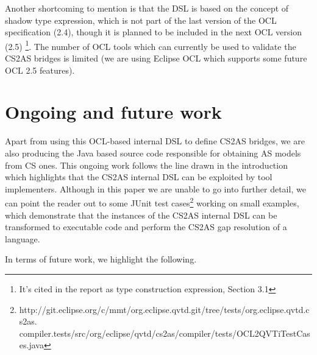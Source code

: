 \documentclass{llncs}
\begin{document}
Another shortcoming to mention is that the DSL is based on the concept of shadow type expression, which is not part of the last version of the OCL specification (2.4), though it is planned to be included in the next OCL version (2.5) \cite{brucker2013aachenReport}\footnote{It's cited in the report as type construction expression, Section 3.1}. The number of OCL tools which can currently be used to validate the CS2AS bridges is limited (we are using Eclipse OCL\cite{eclipseOclOnline} which supports some future OCL 2.5 features).

\section{Ongoing and future work}
\label{sec:futureWork}

Apart from using this OCL-based internal DSL to define CS2AS bridges, we are also producing the Java based source code responsible for obtaining AS models from CS ones. This ongoing work follows  the line drawn in the introduction which highlights that the CS2AS internal DSL can be exploited by tool implementers. Although in this paper we are unable to go into further detail, we can point the reader out to some JUnit test cases\footnote{http://git.eclipse.org/c/mmt/org.eclipse.qvtd.git/tree/tests/org.eclipse.qvtd.cs2as.
compiler.tests/src/org/eclipse/qvtd/cs2as/compiler/tests/OCL2QVTiTestCases.java} working on small examples, which demonstrate that the instances of the CS2AS internal DSL can be transformed to executable code and perform the CS2AS gap resolution of a language.

In terms of future work, we highlight the following.
\end{document}

